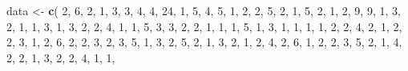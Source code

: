 \documentclass[
]{book}
\newenvironment{Shaded}{\begin{snugshade}}{\end{snugshade}}
\newcommand{\DecValTok}[1]{\textcolor[rgb]{0.00,0.00,0.81}{#1}}
\newcommand{\FunctionTok}[1]{\textcolor[rgb]{0.13,0.29,0.53}{\textbf{#1}}}
\newcommand{\NormalTok}[1]{#1}
\newcommand{\OtherTok}[1]{\textcolor[rgb]{0.56,0.35,0.01}{#1}}
\theoremstyle{definition}
\theoremstyle{definition}
\theoremstyle{definition}
\theoremstyle{definition}
\theoremstyle{remark}
\begin{document}
\begin{Shaded}
\begin{Highlighting}[]
\NormalTok{data }\OtherTok{\textless{}{-}} \FunctionTok{c}\NormalTok{(}
  \DecValTok{2}\NormalTok{, }\DecValTok{6}\NormalTok{, }\DecValTok{2}\NormalTok{, }\DecValTok{1}\NormalTok{, }\DecValTok{3}\NormalTok{, }\DecValTok{3}\NormalTok{, }\DecValTok{4}\NormalTok{, }\DecValTok{4}\NormalTok{, }\DecValTok{24}\NormalTok{, }\DecValTok{1}\NormalTok{, }\DecValTok{5}\NormalTok{, }\DecValTok{4}\NormalTok{, }\DecValTok{5}\NormalTok{, }\DecValTok{1}\NormalTok{,  }\DecValTok{2}\NormalTok{, }\DecValTok{2}\NormalTok{, }\DecValTok{5}\NormalTok{, }\DecValTok{2}\NormalTok{, }\DecValTok{1}\NormalTok{, }\DecValTok{5}\NormalTok{, }
  \DecValTok{2}\NormalTok{, }\DecValTok{1}\NormalTok{, }\DecValTok{2}\NormalTok{, }\DecValTok{9}\NormalTok{, }\DecValTok{9}\NormalTok{, }\DecValTok{1}\NormalTok{, }\DecValTok{3}\NormalTok{, }\DecValTok{2}\NormalTok{, }\DecValTok{1}\NormalTok{,  }\DecValTok{1}\NormalTok{, }\DecValTok{3}\NormalTok{, }\DecValTok{1}\NormalTok{, }\DecValTok{3}\NormalTok{, }\DecValTok{2}\NormalTok{,  }\DecValTok{2}\NormalTok{, }\DecValTok{4}\NormalTok{, }\DecValTok{1}\NormalTok{, }\DecValTok{1}\NormalTok{, }\DecValTok{5}\NormalTok{, }\DecValTok{3}\NormalTok{, }
  \DecValTok{3}\NormalTok{, }\DecValTok{2}\NormalTok{, }\DecValTok{2}\NormalTok{, }\DecValTok{1}\NormalTok{, }\DecValTok{1}\NormalTok{, }\DecValTok{1}\NormalTok{, }\DecValTok{5}\NormalTok{, }\DecValTok{1}\NormalTok{, }\DecValTok{3}\NormalTok{,  }\DecValTok{1}\NormalTok{, }\DecValTok{1}\NormalTok{, }\DecValTok{1}\NormalTok{, }\DecValTok{1}\NormalTok{, }\DecValTok{2}\NormalTok{,  }\DecValTok{2}\NormalTok{, }\DecValTok{4}\NormalTok{, }\DecValTok{2}\NormalTok{, }\DecValTok{1}\NormalTok{, }\DecValTok{2}\NormalTok{, }\DecValTok{2}\NormalTok{, }
  \DecValTok{3}\NormalTok{, }\DecValTok{1}\NormalTok{, }\DecValTok{2}\NormalTok{, }\DecValTok{6}\NormalTok{, }\DecValTok{2}\NormalTok{, }\DecValTok{2}\NormalTok{, }\DecValTok{3}\NormalTok{, }\DecValTok{2}\NormalTok{, }\DecValTok{3}\NormalTok{,  }\DecValTok{5}\NormalTok{, }\DecValTok{1}\NormalTok{, }\DecValTok{3}\NormalTok{, }\DecValTok{2}\NormalTok{, }\DecValTok{5}\NormalTok{,  }\DecValTok{2}\NormalTok{, }\DecValTok{1}\NormalTok{, }\DecValTok{3}\NormalTok{, }\DecValTok{2}\NormalTok{, }\DecValTok{1}\NormalTok{, }\DecValTok{2}\NormalTok{, }
  \DecValTok{4}\NormalTok{, }\DecValTok{2}\NormalTok{, }\DecValTok{6}\NormalTok{, }\DecValTok{1}\NormalTok{, }\DecValTok{2}\NormalTok{, }\DecValTok{2}\NormalTok{, }\DecValTok{3}\NormalTok{, }\DecValTok{5}\NormalTok{, }\DecValTok{2}\NormalTok{,  }\DecValTok{1}\NormalTok{, }\DecValTok{4}\NormalTok{, }\DecValTok{2}\NormalTok{, }\DecValTok{2}\NormalTok{, }\DecValTok{1}\NormalTok{,  }\DecValTok{3}\NormalTok{, }\DecValTok{2}\NormalTok{, }\DecValTok{2}\NormalTok{, }\DecValTok{4}\NormalTok{, }\DecValTok{1}\NormalTok{, }\DecValTok{1}\NormalTok{, }

\end{Highlighting}
\end{Shaded}
\end{document}

